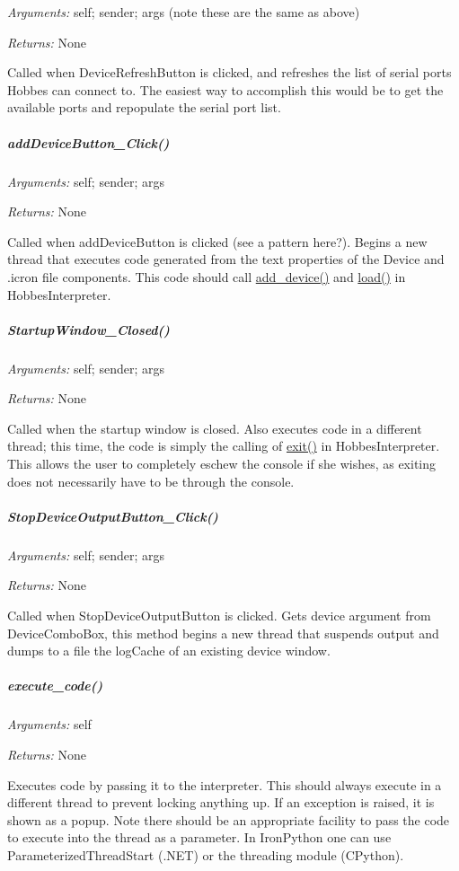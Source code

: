 \documentclass[12pt,letterpaper]{article}
\begin{document}
\emph{Arguments:} self; sender; args (note these are the same as above)

\emph{Returns:} None

Called when DeviceRefreshButton is clicked, and refreshes the list of serial ports Hobbes can connect to. The easiest way to accomplish this would be to get the available ports and repopulate the serial port list.



%
%
\subparagraph{addDeviceButton\_Click()}
\label{4.1.1.1.3}

\emph{Arguments:} self; sender; args

\emph{Returns:} None

Called when addDeviceButton is clicked (see a pattern here?). Begins a new thread that executes code generated from the text properties of the Device and .icron file components. This code should call \hyperref[4.1.1.0.1]{add\_device()} and \hyperref[4.1.1.0.3]{load()} in HobbesInterpreter.



%
%
\subparagraph{StartupWindow\_Closed()}
\label{4.1.1.1.4}

\emph{Arguments:} self; sender; args

\emph{Returns:} None

Called when the startup window is closed. Also executes code in a different thread; this time, the code is simply the calling of \hyperref[4.1.1.0.4]{exit()} in HobbesInterpreter. This allows the user to completely eschew the console if she wishes, as exiting does not necessarily have to be through the console.

%
%
\subparagraph{StopDeviceOutputButton\_Click()}
\label{4.1.1.1.5}

\emph{Arguments:} self; sender; args

\emph{Returns:} None

Called when StopDeviceOutputButton is clicked. Gets device argument from DeviceComboBox, this method begins a new thread that suspends output and dumps to a file the logCache of an existing device window.


%
%
\subparagraph{execute\_code()}
\label{4.1.1.1.6}

\emph{Arguments:} self

\emph{Returns:} None

Executes code by passing it to the interpreter. This should always execute in a different thread to prevent locking anything up. If an exception is raised, it is shown as a popup. Note there should be an appropriate facility to pass the code to execute into the thread as a parameter. In IronPython one can use ParameterizedThreadStart (.NET) or the threading module (CPython).
\end{document}
